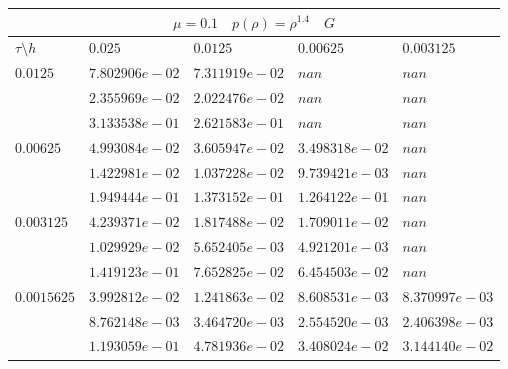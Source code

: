 \documentclass[a4paper,12pt]{extarticle}
\begin{document}
\begin{tabular}{|l|l|l|l|l|}
	\hline
	\multicolumn{5}{|c|}{$\mu =0.1 \quad  p(\rho) = \rho^{1.4} \quad G$}\\
	\hline
	$\tau\setminus h$ & $0.025$ & $0.0125$ & $0.00625$ & $0.003125$\\
	\hline
	$0.0125$  & $7.802906e-02$ & $7.311919e-02$ & $nan$ & $nan$\\
	& $2.355969e-02$ & $2.022476e-02$ & $nan$ & $nan$\\
	& $3.133538e-01$ & $2.621583e-01$ & $nan$ & $nan$\\
	\hline
	$0.00625$  & $4.993084e-02$ & $3.605947e-02$ & $3.498318e-02$ & $nan$\\
	& $1.422981e-02$ & $1.037228e-02$ & $9.739421e-03$ & $nan$\\
	& $1.949444e-01$ & $1.373152e-01$ & $1.264122e-01$ & $nan$\\
	\hline
	$0.003125$  & $4.239371e-02$ & $1.817488e-02$ & $1.709011e-02$ & $nan$\\
	& $1.029929e-02$ & $5.652405e-03$ & $4.921201e-03$ & $nan$\\
	& $1.419123e-01$ & $7.652825e-02$ & $6.454503e-02$ & $nan$\\
	\hline
	$0.0015625$  & $3.992812e-02$ & $1.241863e-02$ & $8.608531e-03$ & $8.370997e-03$\\
	& $8.762148e-03$ & $3.464720e-03$ & $2.554520e-03$ & $2.406398e-03$\\
	& $1.193059e-01$ & $4.781936e-02$ & $3.408024e-02$ & $3.144140e-02$\\
	\hline
\end{tabular}
\end{document}

